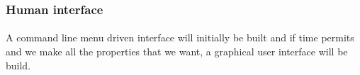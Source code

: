\documentclass{article}
\begin{document}

\subsubsection{Human interface}
\paragraph{}
A command line menu driven interface will initially be built and if time permits and we make all the properties that we want, a graphical user interface will be build.






\end{document}
